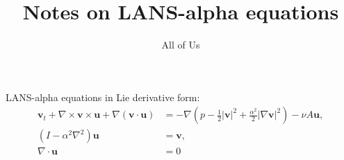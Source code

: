 \documentclass{article}
\def\MM#1{\boldsymbol{#1}}
\def\MM#1{\boldsymbol{#1}}
\begin{document}
\title{Notes on LANS-alpha equations}
\author{All of Us}
\maketitle

LANS-alpha equations in Lie derivative form:
\begin{align}
  \MM{v}_t + \nabla\times \MM{v}\times \MM{u} + \nabla(\MM{v}\cdot\MM{u})
  &= -\nabla \left(p - \frac{1}{2}|\MM{v}|^2 + \frac{\alpha^2}{2}|\nabla\MM{v}|^2\right) - \nu A\MM{u}, \\
  (I - \alpha^2\nabla^2)\MM{u} & = \MM{v}, \\
  \nabla\cdot\MM{u} & = 0
\end{align}
\end{document}
